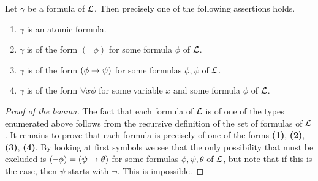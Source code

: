 \begin{lemma}\label{lemma:presentation_of_formulas}
Let $\gamma$ be a formula of ${\mathcal L}$. Then precisely one of the following assertions holds.
\begin{enumerate}[label=\textbf{\emph{(\arabic*)}}, leftmargin=3.0em]
\item $\gamma$ is an atomic formula.
\item $\gamma$ is of the form $(\neg \phi)$ for some formula $\phi$ of ${\mathcal L}$.
\item $\gamma$ is of the form $(\phi \rightarrow \psi)$ for some formulas $\phi, \psi$ of ${\mathcal L}$.
\item $\gamma$ is of the form $\forall x \phi$ for some variable $x$ and some formula $\phi$ of ${\mathcal L}$.
\end{enumerate}
\end{lemma}
\begin{proof}[Proof of the lemma]
The fact that each formula of ${\mathcal L}$ is of one of the types enumerated above follows from the recursive definition of the set of formulas of ${\mathcal L}$. It remains to prove that each formula is precisely of one of the forms \textbf{(1)}, \textbf{(2)}, \textbf{(3)}, \textbf{(4)}. By looking at first symbols we see that the only possibility that must be excluded is $(\neg \phi) = (\psi \rightarrow \theta)$ for some formulas $\phi, \psi, \theta$ of ${\mathcal L}$, but note that if this is the case, then $\psi$ starts with $\neg$. This is impossible.
\end{proof}

